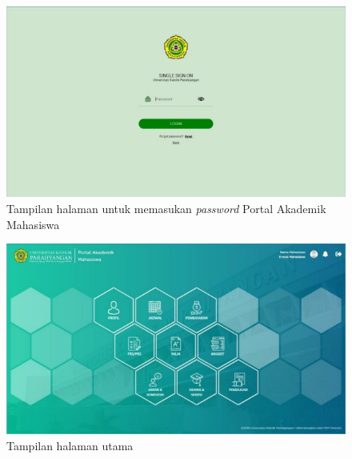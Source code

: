 \begin{enumerate}
\begin{itemize}
		\begin{figure}[H] 
			\centering
			\includegraphics[scale=0.6]{Gambar/pass2018.jpg}
			\caption{Tampilan halaman untuk memasukan \textit{password} Portal Akademik Mahasiswa} 
			\label{fig:pass_2018}
		\end{figure}
		
		\begin{figure}[H]
			\centering
			\includegraphics[scale=0.7]{Gambar/frs2018.jpg}
			\caption{Tampilan halaman utama} 
			\label{fig:frs_2018}
		\end{figure}
	\end{itemize}


\end{enumerate}
